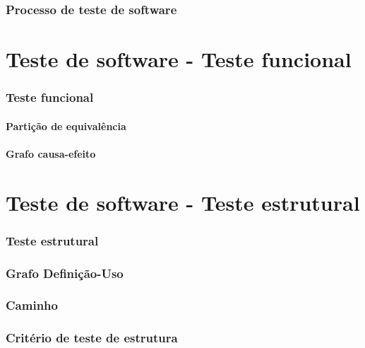 \documentclass[utf8, usepdftitle=false, svgnames, color={table, fixpdftex, hyperref, fixinclude, xcdraw}, t, brazil]{beamer}
\begin{document}
		\section{Processo de teste de software}
		 


	\part{Teste de software - Teste funcional}

		\section{Teste funcional}
		

			\subsection{Partição de equivalência}
			

			\subsection{Grafo causa-efeito}
			 


	\part{Teste de software - Teste estrutural}

		\section{Teste estrutural}
		

		\section{Grafo Definição-Uso}
		

		\section{Caminho}
		

		\section{Critério de teste de estrutura}
		
\end{document}
